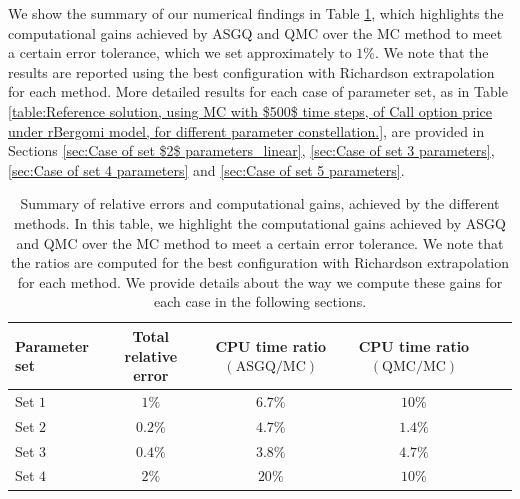 We show  the summary of our numerical findings in Table \ref{table:Summary of our numerical results.}, which  highlights the computational gains achieved by ASGQ and QMC over the MC method to meet a certain error tolerance, which we set approximately to $1\%$. We note that the results are reported using the best configuration with Richardson extrapolation for each method. More detailed results for each case of parameter set, as in Table \ref{table:Reference solution, using MC with $500$ time steps, of Call option price under rBergomi model, for different parameter constellation.},  are provided in  Sections \ref{sec:Case of set $2$ parameters_linear}, \ref{sec:Case of set 3 parameters}, \ref{sec:Case of set 4 parameters} and \ref{sec:Case of set 5 parameters}. 
\FloatBarrier
\begin{table}[!h]
	\centering
	\begin{small}
	\begin{tabular}{l*{4}{c}r}
	\toprule[1.5pt]
		Parameter set              &  Total relative error  & CPU time ratio $\left(\text{ASGQ}/\text{MC} \right)$ & CPU time ratio  $\left( \text{QMC}/\text{MC} \right)$\\
		\hline
			Set $1$  &  $1\%$&  $ 6.7\%$ &  $10\%$\\	
           	
              \hline
            Set $2$     &  $0.2\%$&  $4.7\%$ &  $1.4\%$\\		
				 \hline
					Set $3$    &  $0.4\%$&  $3.8\%$ &  $4.7\%$\\	
					\hline
						Set $4$  &  $2\%$&  $20\%$ &  $10\%$\\	
		\bottomrule[1.25pt]
	\end{tabular}
\end{small}
	\caption{Summary of relative errors and computational gains, achieved by the different methods. In this table, we highlight the computational gains achieved by ASGQ and QMC over the MC method to meet a certain error tolerance. We note that the ratios are computed for the best configuration with Richardson extrapolation for each method. We provide details about the way we compute these gains for each case in the following sections.}
	\label{table:Summary of our numerical results.}
\end{table}
\FloatBarrier

	
	



